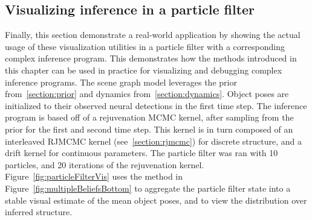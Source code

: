 \subsection{Visualizing inference in a particle filter}
Finally, this section demonstrate a real-world application by showing the actual usage of these visualization utilities in a particle filter with a corresponding complex inference program.
This demonstrates how the methods introduced in this chapter can be used in practice for visualizing and debugging complex inference programs.
The scene graph model leverages the prior from~\ref{section:prior} and dynamics from~\ref{section:dynamics}.
Object poses are initialized to their observed neural detections in the first time step.
The inference program is based off of a rejuvenation MCMC kernel, after sampling from the prior for the first and second time step.
This kernel is in turn composed of an interleaved RJMCMC kernel (see~\ref{section:rjmcmc}) for discrete structure, and a drift kernel for continuous parameters.
The particle filter was ran with 10 particles, and 20 iterations of the rejuvenation kernel.
Figure~\ref{fig:particleFilterVis} uses the method in Figure~\ref{fig:multipleBeliefsBottom} to aggregate the particle filter state into a stable visual estimate of the mean object poses, and to view the distribution over inferred structure.
